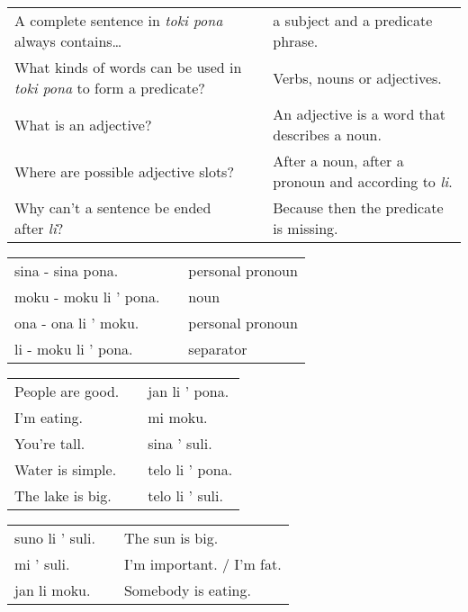 \begin{supertabular}{p{5,5cm}|ll}
    A complete sentence in \textit{toki pona} always contains\dots                &  & a subject and a predicate phrase.                                          \\ %
    What kinds of words can be used in \textit{toki pona} to form a predicate?    &  & Verbs, nouns or adjectives.                                                \\ %
    What is an adjective?                                                         &  & An adjective is a word that describes a noun.                              \\ %
    Where are possible adjective slots?                                           &  & After a noun, after a pronoun and according to \textit{li}.                \\  %
    Why can't a sentence be ended after \textit{li}?                              &  & Because then the predicate is missing.                                     \\ %
\end{supertabular}

\begin{supertabular}{p{5,5cm}|ll}
    sina - sina pona.      &  & personal pronoun \\ %
    moku - moku li ' pona. &  & noun             \\ %
    ona - ona li ' moku.   &  & personal pronoun \\ %
    li - moku li ' pona.   &  & separator        \\ %
\end{supertabular}

\begin{supertabular}{p{5,5cm}|ll}
    People are good. &  & jan li ' pona.  \\ %
    I'm eating.      &  & mi moku.        \\ %
    You're tall.     &  & sina ' suli.    \\ %
    Water is simple. &  & telo li ' pona. \\ %
    The lake is big. &  & telo li ' suli. \\ %
\end{supertabular}

\begin{supertabular}{p{5,5cm}|ll}
    suno li ' suli. &  & The sun is big.           \\
    mi ' suli.      &  & I'm important. / I'm fat. \\
    jan li moku.    &  & Somebody is eating.       \\
\end{supertabular}

